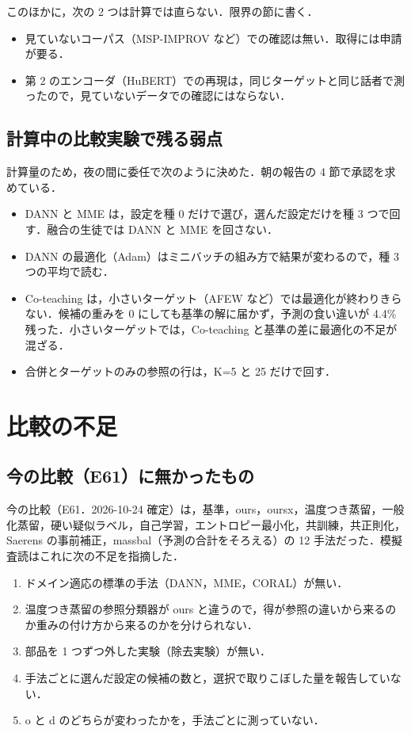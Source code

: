 \documentclass[a4paper,11pt]{ltjsarticle}
\begin{document}
このほかに，次の 2 つは計算では直らない．限界の節に書く．

\begin{itemize}
\item 見ていないコーパス（MSP-IMPROV など）での確認は無い．取得には申請が要る．
\item 第 2 のエンコーダ（HuBERT）での再現は，同じターゲットと同じ話者で測ったので，見ていないデータでの確認にはならない．
\end{itemize}

\subsection{計算中の比較実験で残る弱点}

計算量のため，夜の間に委任で次のように決めた．朝の報告の 4 節で承認を求めている．

\begin{itemize}
\item DANN と MME は，設定を種 0 だけで選び，選んだ設定だけを種 3 つで回す．融合の生徒では DANN と MME を回さない．
\item DANN の最適化（Adam）はミニバッチの組み方で結果が変わるので，種 3 つの平均で読む．
\item Co-teaching は，小さいターゲット（AFEW など）では最適化が終わりきらない．候補の重みを 0 にしても基準の解に届かず，予測の食い違いが 4.4\% 残った．小さいターゲットでは，Co-teaching と基準の差に最適化の不足が混ざる．
\item 合併とターゲットのみの参照の行は，K=5 と 25 だけで回す．
\end{itemize}

\section{比較の不足}

\subsection{今の比較（E61）に無かったもの}

今の比較（E61．2026-10-24 確定）は，基準，ours，oursx，温度つき蒸留，一般化蒸留，硬い疑似ラベル，自己学習，エントロピー最小化，共訓練，共正則化，Saerens の事前補正，massbal（予測の合計をそろえる）の 12 手法だった．模擬査読はこれに次の不足を指摘した．

\begin{enumerate}
\item ドメイン適応の標準の手法（DANN，MME，CORAL）が無い．
\item 温度つき蒸留の参照分類器が ours と違うので，得が参照の違いから来るのか重みの付け方から来るのかを分けられない．
\item 部品を 1 つずつ外した実験（除去実験）が無い．
\item 手法ごとに選んだ設定の候補の数と，選択で取りこぼした量を報告していない．
\item o と d のどちらが変わったかを，手法ごとに測っていない．
\end{enumerate}
\end{document}
